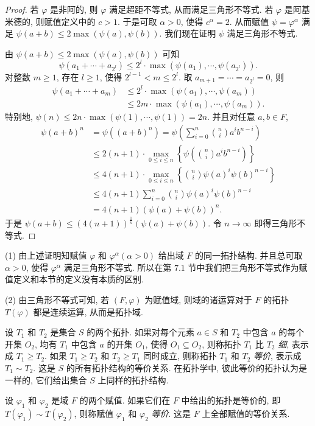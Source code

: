 \begin{proof}
若 $\varphi$ 是非阿的, 则 $\varphi$ 满足超距不等式, 从而满足三角形不等式. 若 $\varphi$ 是阿基米德的, 则赋值定义中的 $c>1$. 于是可取 $\alpha>0$, 使得 $c^{\alpha}=2$. 从而赋值 $\psi=\varphi^{\alpha}$ 满足 $\psi(a+b)\leqslant 2\max(\psi(a),\psi(b))$. 我们现在证明 $\psi$ 满足三角形不等式.

由 $\psi(a+b)\leqslant 2\max(\psi(a),\psi(b))$ 可知
\[
  \psi(a_1+\cdots+a_{2^l})\leqslant 2^l\cdot\max\left(\psi(a_1),\cdots,\psi(a_{2^l})\right).
\]
对整数 $m\geqslant 1$, 存在 $l\geqslant 1$, 使得 $2^{l-1}<m\leqslant 2^l$. 取 $a_{m+1}=\cdots=a_{2^l}=0$, 则
\begin{align*}
  \psi(a_1+\cdots+a_m)&\leqslant 2^l\cdot\max(\psi(a_1),\cdots,\psi(a_m))\\
  &\leqslant 2m\cdot\max(\psi(a_1),\cdots,\psi(a_m)).
\end{align*}
特别地, $\psi(n)\leqslant 2n\cdot\max(\psi(1),\cdots,\psi(1))=2n$. 并且对任意 $a,b\in F$,
\begin{align*}
  \psi(a+b)^n&=\psi((a+b)^n)=\psi\left(\sum_{i=0}^{n}\binom{n}{i}a^ib^{n-i}\right)\\
  &\leqslant 2(n+1)\cdot\max_{0\leqslant i\leqslant n}\left\{\psi\left(\binom{n}{i}a^ib^{n-i}\right)\right\}\\
  &\leqslant 4(n+1)\cdot\max_{0\leqslant i\leqslant n}\left\{\binom{n}{i}\psi(a)^i\psi(b)^{n-i}\right\}\\
  &\leqslant 4(n+1)\sum_{i=0}^{n}\binom{n}{i}\psi(a)^i\psi(b)^{n-i}\\
  &=4(n+1)(\psi(a)+\psi(b))^n.
\end{align*}
于是 $\psi(a+b)\leqslant(4(n+1))^{\frac{1}{n}}(\psi(a)+\psi(b))$. 令 $n\to\infty$ 即得三角形不等式.
\end{proof}

\begin{remark}
(1) 由上述证明知赋值 $\varphi$ 和 $\varphi^{\alpha}(\alpha>0)$ 给出域 $F$ 的同一拓扑结构. 并且总可取 $\alpha>0$, 使得 $\varphi^{\alpha}$ 满足三角形不等式. 所以在第 $7.1$ 节中我们把三角形不等式作为赋值定义和本节的定义没有本质的区别.

(2) 由三角形不等式可知, 若 $(F,\varphi)$ 为赋值域, 则域的诸运算对于 $F$ 的拓扑 $T(\varphi)$ 都是连续运算, 从而是拓扑域.
\end{remark}

\begin{definition}\label{def:ch7-3}
设 $T_1$ 和 $T_2$ 是集合 $S$ 的两个拓扑. 如果对每个元素 $a\in S$ 和 $T_2$ 中包含 $a$ 的每个开集 $O_2$, 均有 $T_1$ 中包含 $a$ 的开集 $O_1$, 使得 $O_1\subseteq O_2$, 则称拓扑 $T_1$ 比 $T_2$ \emph{细}, 表示成 $T_1\geqslant T_2$. 如果 $T_1\geqslant T_2$ 和 $T_2\geqslant T_1$ 同时成立, 则称拓扑 $T_1$ 和 $T_2$ \emph{等价}, 表示成 $T_1\sim T_2$. 这是 $S$ 的所有拓扑结构的等价关系. 在拓扑学中, 彼此等价的拓扑认为是一样的, 它们给出集合 $S$ 上同样的拓扑结构.

设 $\varphi_1$ 和 $\varphi_2$ 是域 $F$ 的两个赋值. 如果它们在 $F$ 中给出的拓扑是等价的, 即 $T(\varphi_1)\sim T(\varphi_2)$, 则称赋值 $\varphi_1$ 和 $\varphi_2$ \emph{等价}. 这是 $F$ 上全部赋值的等价关系.
\end{definition}

